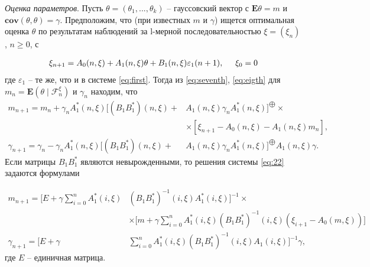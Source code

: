 \begin{example}
	\textit{Оценка параметров}. Пусть $\theta = (\theta_1, ..., \theta_k)$ – гауссовский вектор с $\mathbf{E}\theta = m$ и $\mathbf{cov}(\theta, \theta) = \gamma$. Предположим, что (при известных $m$ и $\gamma$) ищется оптимальная оценка $\theta$ по результатам наблюдений за l-мерной последовательностью $\xi = (\xi_n)$, $n \geqslant 0$, с
	
	\begin{align}
	\label{eq:21}
	\xi_{n+1} = A_0 (n, \xi) + A_1 (n, \xi)\theta + B_1 (n, \xi)\varepsilon_1 (n + 1), \hspace{0.5cm}\xi_0 = 0
	\end{align}
	где $\varepsilon_1$ – те же, что и в системе \eqref{eq:first}. Тогда из \eqref{eq:seventh}, \eqref{eq:eigth} для $m_n = \mathbf{E}(\theta \mid \mathscr{F}^\xi_n)$ и $\gamma_n$ находим, что
	\begin{equation}
	\label{eq:22}
	\begin{split}
	m_{n+1} = m_n + \gamma_n A^*_1 (n, \xi) [(B_1 B^*_1) (n, \xi) + &A_1 (n, \xi) \gamma_n A^*_1 (n, \xi)]^{\bigoplus} \times \\
	&\times [\xi_{n+1} - A_0 (n, \xi) - A_1 (n, \xi) m_n],\\
	\gamma_{n+1} = \gamma_n - \gamma_n A^*_1 (n, \xi) [(B_1B^*_1) (n, \xi) + &A_1 (n, \xi)\gamma_n A^*_1 (n, \xi)]^{\bigoplus} A_1 (n, \xi)\gamma.
	\end{split}
	\end{equation}
	Если матрицы $B_1 B^*_1$ являются невырожденными, то решения системы \eqref{eq:22} задаются формулами

	\begin{equation}
	\label{eq:23}
	\begin{split}
	m_{n + 1} = \Bigg[E + \gamma \sum\limits_{i = 0}^n A^*_1 (i, \xi)& (B_1B^*_1)^{-1} (i, \xi)A^*_1 (i, \xi) \Bigg] ^{-1} \times \\
	& \times \Bigg[m + \gamma \sum\limits_{i = 0}^n A^*_1 (i, \xi) (B_1B^*_1)^{-1} (i, \xi) \left(\xi_{i + 1} - A_0(m, \xi)\right)\Bigg] \\
	\gamma_{n + 1} = \Bigg[E + \gamma &\sum\limits_{i = 0}^n A^*_1 (i, \xi) (B_1B^*_1)^{-1} (i, \xi)A_1 (i, \xi) \Bigg]^{-1} \gamma,
	\end{split}
	\end{equation}
	где $E$ – единичная матрица.
\end{example}

